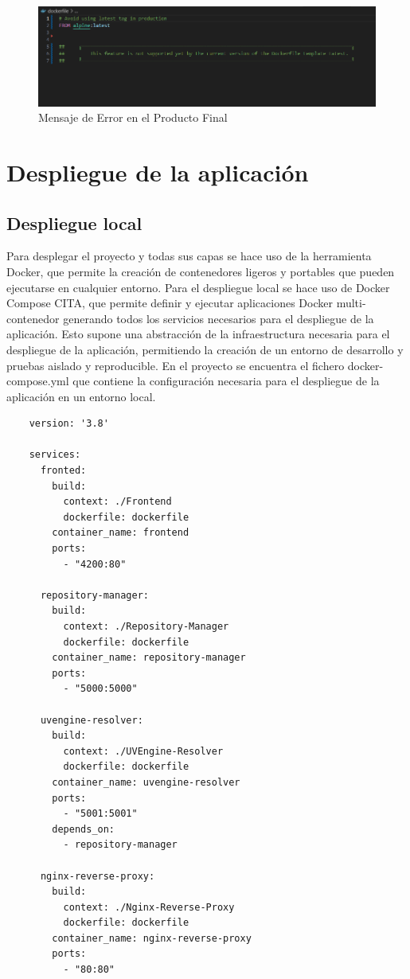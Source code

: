 \documentclass[12pt, a4paper, twoside]{article}
\begin{document}
\begin{figure}[h]
	\centering
	  \includegraphics[width=1\textwidth]{unupportedfeature.png}
	\caption{Mensaje de Error en el Producto Final}
\end{figure}








\section{Despliegue de la aplicación }
\label{sec:Despliegue de la aplicación}
\subsection{ Despliegue local }
Para desplegar el proyecto y todas sus capas se hace uso de la herramienta Docker, que permite la creación de contenedores ligeros y portables que pueden ejecutarse en cualquier entorno.
Para el despliegue local se hace uso de Docker Compose CITA, que permite definir y ejecutar aplicaciones Docker multi-contenedor generando todos los servicios necesarios para el despliegue de la aplicación.
Esto supone una abstracción de la infraestructura necesaria para el despliegue de la aplicación, permitiendo la creación de un entorno de desarrollo y pruebas aislado y reproducible.
En el proyecto se encuentra el fichero docker-compose.yml que contiene la configuración necesaria para el despliegue de la aplicación en un entorno local.
\begin{verbatim}
	version: '3.8'

	services:
	  fronted:
		build:
		  context: ./Frontend
		  dockerfile: dockerfile
		container_name: frontend
		ports:
		  - "4200:80"
	  
	  repository-manager:
		build:
		  context: ./Repository-Manager
		  dockerfile: dockerfile
		container_name: repository-manager
		ports:
		  - "5000:5000"
	
	  uvengine-resolver:
		build:
		  context: ./UVEngine-Resolver
		  dockerfile: dockerfile
		container_name: uvengine-resolver
		ports:
		  - "5001:5001"
		depends_on:
		  - repository-manager
	  
	  nginx-reverse-proxy:
		build:
		  context: ./Nginx-Reverse-Proxy
		  dockerfile: dockerfile
		container_name: nginx-reverse-proxy
		ports:
		  - "80:80"
	\end{verbatim}
\end{document}
